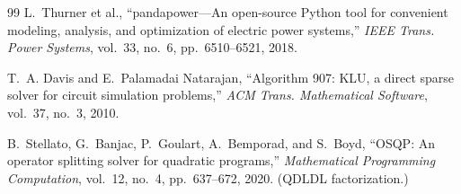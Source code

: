 \documentclass[11pt]{article}
\begin{document}
\begin{thebibliography}{99}
L.~Thurner et al., ``pandapower---An open-source Python tool for
convenient modeling, analysis, and optimization of electric power
systems,'' \emph{IEEE Trans. Power Systems}, vol.~33, no.~6,
pp.~6510--6521, 2018.

T.~A. Davis and E.~Palamadai Natarajan, ``Algorithm 907: KLU, a direct
sparse solver for circuit simulation problems,'' \emph{ACM Trans.
Mathematical Software}, vol.~37, no.~3, 2010.

B.~Stellato, G.~Banjac, P.~Goulart, A.~Bemporad, and S.~Boyd,
``OSQP: An operator splitting solver for quadratic programs,''
\emph{Mathematical Programming Computation}, vol.~12, no.~4,
pp.~637--672, 2020. (QDLDL factorization.)

\end{thebibliography}
\end{document}
